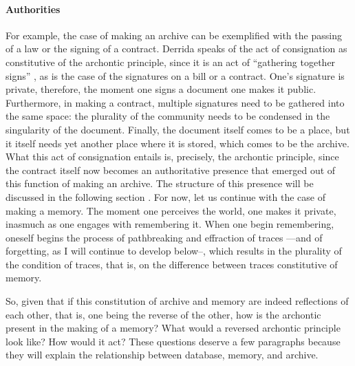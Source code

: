\paragraph{Authorities}
For example, the case of making an archive can be exemplified with the passing of a law or the signing of a contract. Derrida speaks of the act of consignation as constitutive of the archontic principle, since it is an act of ``gathering together signs'' \parencite[10]{Der95:Arc}, as is the case of the signatures on a bill or a contract. One's signature is private, therefore, the moment one signs a document one makes it public. Furthermore, in making a contract, multiple signatures need to be gathered into the same space: the plurality of the community needs to be condensed in the singularity of the document. Finally, the document itself comes to be a place, but it itself needs yet another place where it is stored, which comes to be the archive. What this act of consignation entails is, precisely, the archontic principle, since the contract itself now becomes an authoritative presence that emerged out of this function of making an archive. The structure of this presence will be discussed in the following section . For now, let us continue with the case of making a memory. The moment one perceives the world, one makes it private, inasmuch as one engages with remembering it. When one begin remembering, oneself begins the process of pathbreaking and effraction of traces ---and of forgetting, as I will continue to develop below--, which results in the plurality of the condition of traces, that is, on the difference between traces constitutive of memory.

So, given that if this constitution of archive and memory are indeed reflections of each other, that is, one being the reverse of the other, how is the archontic present in the making of a memory? What would a reversed archontic principle look like? How would it act? These questions deserve a few paragraphs because they will explain the relationship between database, memory, and archive. 

